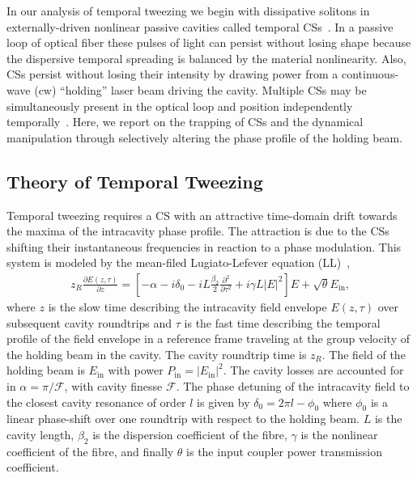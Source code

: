 In our analysis of temporal tweezing we begin with dissipative solitons in externally-driven nonlinear passive cavities called temporal CSs~\cite{XuCoenRef22a,XuCoenRef22b,info15,info17,info19,info21}.  In a passive loop of optical fiber these pulses of light can persist without losing shape because the dispersive temporal spreading is balanced by the material nonlinearity.   Also, CSs persist without losing their intensity by drawing power from a continuous-wave (cw) ``holding'' laser beam driving the cavity.  Multiple CSs may be simultaneously present in the optical loop and position independently temporally~\cite{info16}.  Here, we report on the trapping of CSs and the dynamical manipulation through selectively altering the phase profile of the holding beam.  

\subsection{Theory of Temporal Tweezing}  \label{secTweezeTheroy}
Temporal tweezing requires a CS with an attractive time-domain drift towards the maxima of the intracavity phase profile.  The attraction is due to the CSs shifting their instantaneous frequencies in reaction to a phase modulation.   This system is modeled by the mean-filed Lugiato-Lefever equation (LL)~\cite{tweeze,LL,LLE},
\begin{align}
z_R \frac{\partial E(z, \tau) }{\partial z} = \left[ -\alpha - i \delta_0 - i L \frac{\beta_2}{2} \frac{\partial^2}{\partial \tau^2} + i \gamma L |E|^2 \right] E + \sqrt{\theta}E_{\mathrm{in}},
\label{eq:LLETweeze1}
\end{align}
where $z$ is the slow time describing the intracavity field envelope $E(z,\tau)$ over subsequent cavity roundtrips and $\tau$ is the fast time describing the temporal profile of the field envelope in a reference frame traveling at the group velocity of the holding beam in the cavity.  The cavity roundtrip time is $z_R$.  The field of the holding beam is $E_{\mathrm{in}}$ with power $P_{\mathrm{in}} = |E_{\mathrm{in}}|^2$.  The cavity losses are accounted for in $\alpha = \pi/\mathscr{F}$, with cavity finesse $\mathscr{F}$.  The phase detuning of the intracavity field to the closest cavity resonance of order $l$ is given by $\delta_0 = 2\pi l - \phi_0$ where $\phi_0$ is a linear phase-shift over one roundtrip with respect to the holding beam.  $L$ is the cavity length, $\beta_2$ is the dispersion coefficient of the fibre, $\gamma$ is the nonlinear coefficient of the fibre, and finally $\theta$ is the input coupler power transmission coefficient.  

